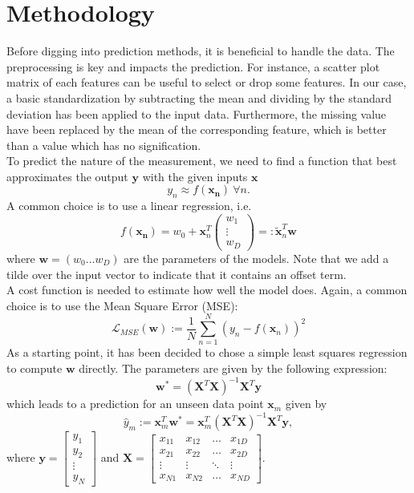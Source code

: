 \documentclass[10pt,conference,compsocconf]{IEEEtran}
\newcommand{\xx}{\mathbf{x}}
\newcommand{\yy}{\mathbf{y}}
\newcommand{\ww}{\mathbf{w}}
\newcommand{\XX}{\mathbf{X}}
\newcommand{\Lagr}{\mathcal{L}}
\newcommand{\Lmse}{\Lagr_{MSE}}
\begin{document}
\section{Methodology}
Before digging into prediction methods, it is beneficial to handle the data. The preprocessing is key and impacts the prediction. For instance, a scatter plot matrix of each features can be useful to select or drop some features. In our case, a basic standardization by subtracting the mean and dividing by the standard deviation has been applied to the input data. Furthermore, the missing value have been replaced by the mean of the corresponding feature, which is better than a value which has no signification.\\
To predict the nature of the measurement, we need to find a function that best approximates the output $\yy$ with the given inputs $\xx$
$$
y_n \approx f(\mathbf{x_n}) \ \forall n.
$$
A common choice is to use a linear regression, i.e.
$$
f(\mathbf{x_n}) = w_0 +  \xx_n^T\begin{pmatrix} w_1 \\ \vdots\\ w_D \end{pmatrix} =: \tilde{\xx}_n^T \ww
$$
where $\ww = (w_0 \ldots w_D)$ are the parameters of the models. Note that we add a tilde over the input vector to indicate that it contains an offset term.\\
A cost function is needed to estimate how well the model does. Again, a common choice is to use the Mean Square Error (MSE):
$$
\Lmse(\ww) := \frac 1N \sum_{n=1}^N \left( y_n -f(\xx_n) \right)^2
$$
As a starting point, it has been decided to chose a simple least squares regression  to compute $\ww$ directly. The parameters are given by the following expression:
$$
\ww^* = (\XX^T\XX)^{-1}\XX^T\yy
$$
which leads to a prediction for an unseen data point $\xx_m$ given by
$$
\hat{y}_m := \xx_m^T\ww^*=\xx_m^T(\XX^T\XX)^{-1}\XX^T\yy,
$$
where $\yy = \begin{bmatrix}y_1 \\ y_2 \\ \vdots \\y_N \end{bmatrix}$ and $\XX = \begin{bmatrix}x_{11} & x_{12} & \hdots & x_{1D} \\ x_{21} & x_{22} & \hdots & x_{2D} \\ \vdots & \vdots & \ddots & \vdots \\ x_{N1} & x_{N2} & \hdots & x_{ND} \end{bmatrix}$.
\end{document}
